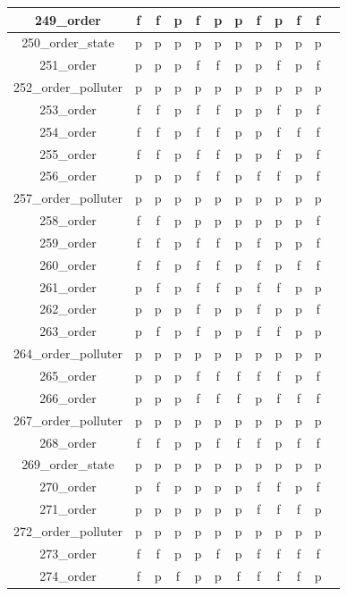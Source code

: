 \documentclass[
fancyheadings, %
%
%
]{stsreprt}
\begin{document}
\begin{longtable}{|c|c|c|c|c|c|c|c|c|c|c|c|}
\hline
249\_order & f & f & p & f & p & p & f & p & f & f \\
\hline
250\_order\_state & p & p & p & p & p & p & p & p & p & p \\
\hline
251\_order & p & p & p & f & f & p & p & f & p & f \\
\hline
252\_order\_polluter & p & p & p & p & p & p & p & p & p & p \\
\hline
253\_order & f & f & p & f & f & p & p & f & p & f \\
\hline
254\_order & f & f & p & f & f & p & p & f & f & f \\
\hline
255\_order & f & f & p & f & f & p & p & f & p & f \\
\hline
256\_order & p & p & p & f & f & p & f & f & p & f \\
\hline
257\_order\_polluter & p & p & p & p & p & p & p & p & p & p \\
\hline
258\_order & f & f & p & p & p & p & p & p & p & f \\
\hline
259\_order & f & f & p & f & f & p & f & p & p & f \\
\hline
260\_order & f & f & p & f & f & p & f & p & f & f \\
\hline
261\_order & p & f & p & f & f & p & f & f & p & p \\
\hline
262\_order & p & p & p & f & p & p & f & p & p & f \\
\hline
263\_order & p & f & p & f & p & p & f & f & p & p \\
\hline
264\_order\_polluter & p & p & p & p & p & p & p & p & p & p \\
\hline
265\_order & p & p & p & f & f & f & f & f & p & f \\
\hline
266\_order & p & p & p & f & f & f & p & f & f & f \\
\hline
267\_order\_polluter & p & p & p & p & p & p & p & p & p & p \\
\hline
268\_order & f & f & p & p & f & f & f & p & f & f \\
\hline
269\_order\_state & p & p & p & p & p & p & p & p & p & p \\
\hline
270\_order & p & f & p & p & p & p & f & f & p & f \\
\hline
271\_order & p & p & p & p & p & p & f & f & f & p \\
\hline
272\_order\_polluter & p & p & p & p & p & p & p & p & p & p \\
\hline
273\_order & f & f & p & p & f & p & f & f & f & f \\
\hline
274\_order & f & p & f & p & p & f & f & f & f & p \\

\end{longtable}
\end{document}
